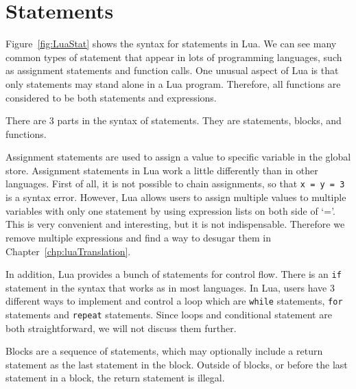 \section{Statements}
Figure~\ref{fig:LuaStat} shows the syntax for statements in Lua. We can see many common types of statement that appear in lots of programming languages, such as assignment statements and function calls.
One unusual aspect of Lua is that only statements may stand alone in a Lua program.
Therefore, all functions are considered to be both statements and expressions.

There are 3 parts in the syntax of statements.
They are statements, blocks, and functions.

Assignment statements are used to assign a value to specific variable in the global store.
Assignment statements in Lua work a little differently than in other languages.
First of all, it is not possible to chain assignments, so that {\tt x = y = 3} is a syntax error.
However, Lua allows users to assign multiple values to multiple variables with only one statement by using expression lists on both side of `='. This is very convenient and interesting, but it is not indispensable. Therefore we remove multiple expressions and find a way to desugar them in Chapter~\ref{chp:luaTranslation}.

In addition, Lua provides a bunch of statements for control flow. There is an {\tt if} statement in the syntax that works as in most languages.
In Lua, users have 3 different ways to implement and control a loop which are {\tt while} statements, {\tt for} statements and {\tt repeat} statements. Since loops and conditional statement are both straightforward, we will not discuss them further.

Blocks are a sequence of statements,
which may optionally include a return statement as the last statement in the block.
Outside of blocks, or before the last statement in a block,
the return statement is illegal.

\newcommand{\assign}[2]{{\overline{#1_i}}~{=}~{\overline{#2_j}}}
\newcommand{\doe}[1]{\mbox{\tt do}~#1~{\tt end}}
\newcommand{\ife}[3]{\mbox{\tt if}~{#1}~\mbox{\tt then}~{#2}~\mbox{\tt else}~{#3}~{\tt end}}
\newcommand{\whilee}[2]{\mbox{\tt while}~#1~{\tt do}~#2~{\tt end}}
\newcommand{\repeate}[2]{\mbox{\tt repeat}~#2~{\tt until}~#1~}
\newcommand{\for}[3]{\mbox{\tt for}~#1~=~#2_1,~#2_2,~#2_3~{\tt do}~#3~{\tt end}}
\newcommand{\function}[3]{\mbox{\tt function}~#1({\overline{#2_i}})~#3~{\tt end}}
\newcommand{\local}[2]{\mbox{\tt local}~{\assign #1 #2}}

